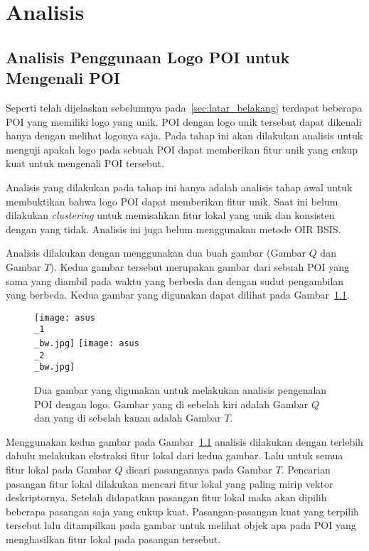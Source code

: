 \chapter{Analisis}
\label{chap:analisis}

\section{Analisis Penggunaan Logo POI untuk Mengenali POI}
\label{sec:analisis_logo}
Seperti telah dijelaskan sebelumnya pada~\ref{sec:latar_belakang} terdapat beberapa POI yang memiliki logo yang unik. POI dengan logo unik tersebut dapat dikenali hanya dengan melihat logonya saja. Pada tahap ini akan dilakukan analisis untuk menguji apakah logo pada sebuah POI dapat memberikan fitur unik yang cukup kuat untuk mengenali POI tersebut.

Analisis yang dilakukan pada tahap ini hanya adalah analisis tahap awal untuk membuktikan bahwa logo POI dapat memberikan fitur unik. Saat ini belum dilakukan \textit{clustering} untuk memisahkan fitur lokal yang unik dan konsisten dengan yang tidak. Analisis ini juga belum menggunakan metode OIR BSIS.

Analisis dilakukan dengan menggunakan dua buah gambar (Gambar $Q$ dan Gambar $T$). Kedua gambar tersebut merupakan gambar dari sebuah POI yang sama yang diambil pada waktu yang berbeda dan dengan sudut pengambilan yang berbeda. Kedua gambar yang digunakan dapat dilihat pada Gambar~\ref{fig:analisis_asus}. 
\begin{figure}[H]
	\centering
	\texttt{[image: asus\\\_1\\\_bw.jpg]}
	\texttt{[image: asus\\\_2\\\_bw.jpg]}
	\caption{Dua gambar yang digunakan untuk melakukan analisis pengenalan POI dengan logo. Gambar yang di sebelah kiri adalah Gambar $Q$ dan yang di sebelah kanan adalah Gambar $T$.}
	\label{fig:analisis_asus}
\end{figure}

Menggunakan kedua gambar pada Gambar~\ref{fig:analisis_asus} analisis dilakukan dengan terlebih dahulu melakukan ekstraksi fitur lokal dari kedua gambar. Lalu untuk semua fitur lokal pada Gambar $Q$ dicari pasangannya pada Gambar $T$. Pencarian pasangan fitur lokal dilakukan mencari fitur lokal yang paling mirip vektor deskriptornya. Setelah didapatkan pasangan fitur lokal maka akan dipilih beberapa pasangan saja yang cukup kuat. Pasangan-pasangan kuat yang terpilih tersebut lalu ditampilkan pada gambar untuk melihat objek apa pada POI yang menghasilkan fitur lokal pada pasangan tersebut.

